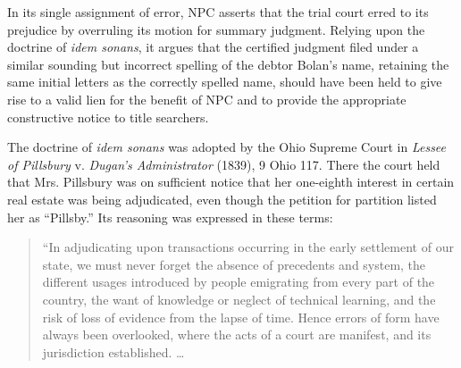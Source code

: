 In its single assignment of error, NPC asserts that the trial court erred to its
prejudice by overruling its motion for summary judgment. Relying upon the
doctrine of \textit{idem sonans}, it argues that the certified judgment filed
under a similar sounding but incorrect spelling of the debtor Bolan's name,
retaining the same initial letters as the correctly spelled name, should have
been held to give rise to a valid lien for the benefit of NPC and to provide
the appropriate constructive notice to title searchers.

The doctrine of \textit{idem sonans} was adopted by the Ohio Supreme Court in
\textit{Lessee of Pillsbury} v. \textit{Dugan's Administrator} (1839), 9 Ohio
117. There the court held that Mrs. Pillsbury was on sufficient notice that her
one-eighth interest in certain real estate was being adjudicated, even though
the petition for partition listed her as ``Pillsby.'' Its reasoning was
expressed in these terms:

\begin{quote}
{}``In adjudicating upon transactions occurring in the early settlement of our
state, we must never forget the absence of precedents and system, the different
usages introduced by people emigrating from every part of the country, the want
of knowledge or neglect of technical learning, and the risk of loss of evidence
from the lapse of time. Hence errors of form have always been overlooked, where
the acts of a court are manifest, and its jurisdiction established. \dots{}
\end{quote}

